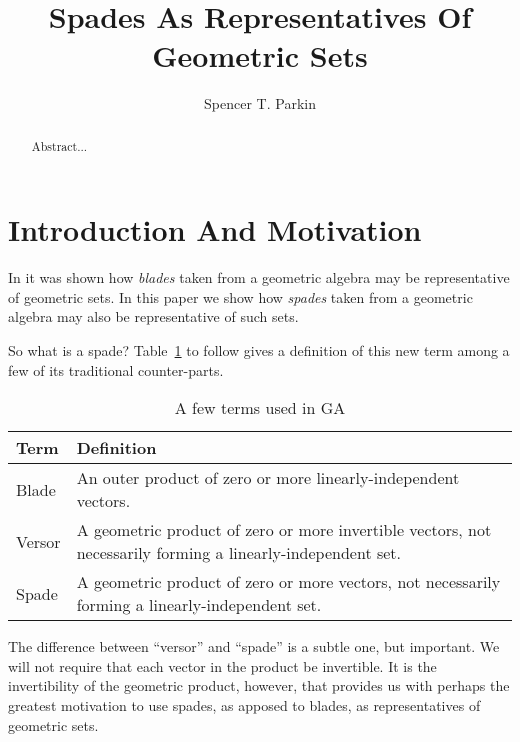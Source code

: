 \documentclass{birkjour}
\theoremstyle{definition}
\theoremstyle{remark}
\numberwithin{equation}{section}
\begin{document}
\title{Spades As Representatives Of Geometric Sets}

\author{Spencer T. Parkin}



\begin{abstract}
Abstract...
\end{abstract}


\maketitle

\section{Introduction And Motivation}

In \cite{Parkin15} it was shown how \emph{blades} taken from a geometric algebra may be representative of geometric sets.
In this paper we show how \emph{spades} taken from a geometric algebra may also be representative of such sets.

So what is a spade?  Table~\ref{tbl_terms} to follow gives a definition of this new term among a few of its traditional counter-parts.

\begin{table}[H]\label{tbl_terms}\caption{A few terms used in GA}
\begin{tabular}{p{1cm}p{9cm}}
Term & Definition \\
\hline
Blade & An outer product of zero or more linearly-independent vectors. \\
Versor & A geometric product of zero or more invertible vectors, not necessarily forming a linearly-independent set. \\
Spade & A geometric product of zero or more vectors, not necessarily forming a linearly-independent set.
\end{tabular}
\end{table}

The difference between ``versor'' and ``spade'' is a subtle one, but important.  We will not require that each vector
in the product be invertible.  It is the invertibility of the geometric product, however, that provides us with perhaps the
greatest motivation to use spades, as apposed to blades, as representatives of geometric sets.
\end{document}
